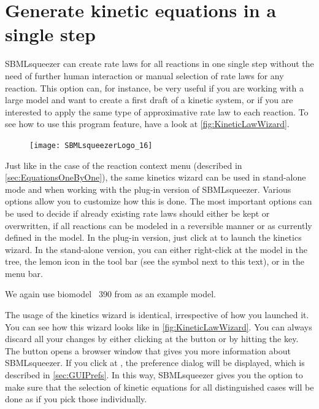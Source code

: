\section{Generate kinetic equations in a single step}

SBMLsqueezer can create rate laws for all reactions in one single step without the need of further human interaction or manual selection of rate laws for any reaction.
This option can, for instance, be very useful if you are working with a large model and want to create a first draft of a kinetic system, or if you are interested to apply the same type of approximative rate law to each reaction.
To see how to use this program feature, have a look at \vref{fig:KineticLawWizard}.

\begin{figure}
\vspace{\wrapfigspace}
\texttt{[image: SBMLsqueezerLogo\_16]}
\end{figure}
Just like in the case of the reaction context menu (described in \vref{sec:EquationsOneByOne}), the same kinetics wizard can be used in stand-alone mode and when working with the \CellDesigner plug-in version of SBMLsqueezer.
Various options allow you to customize how this is done.
The most important options can be used to decide if already existing rate laws should either be kept or overwritten, if all reactions can be modeled in a reversible manner or as currently defined in the model.
In the \CellDesigner plug-in version, just click at  to launch the kinetics wizard.
In the stand-alone version, you can either right-click at the model in the \SBML tree, the lemon icon in the tool bar (see the symbol next to this text), or  in the menu bar.

We again use biomodel \numero~390 from \BioModels \citep{Li2010a} as an example model.

The usage of the kinetics wizard is identical, irrespective of how you launched it.
You can see how this wizard looks like in \vref{fig:KineticLawWizard}.
You can always discard all your changes by either clicking at the  button or by hitting the \keys{\escwin} key.
The  button opens a browser window that gives you more information about SBMLsqueezer.
If you click at , the preference dialog will be displayed, which is described in \vref{sec:GUIPrefs}.
In this way, SBMLsqueezer gives you the option to make sure that the selection of kinetic equations for all distinguished cases will be done as if you pick those individually.

